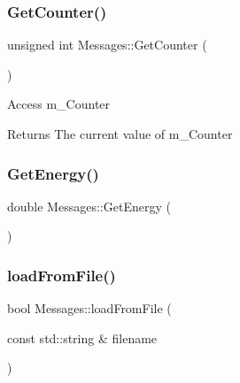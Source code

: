 \mbox{\label{classMessages_a256f8190d9ef6e25db6a5030f9805b5d}} 
\subsubsection{\texorpdfstring{Get\+Counter()}{GetCounter()}}
{\footnotesize\ttfamily unsigned int Messages\+::\+Get\+Counter (\begin{DoxyParamCaption}{ }\end{DoxyParamCaption})\hspace{0.3cm}{\ttfamily [inline]}}

Access m\+\_\+\+Counter \begin{DoxyReturn}{Returns}
The current value of m\+\_\+\+Counter 
\end{DoxyReturn}
\mbox{\label{classMessages_ab33cb49f408b16cf1fa29b5f141921c4}} 
\subsubsection{\texorpdfstring{Get\+Energy()}{GetEnergy()}}
{\footnotesize\ttfamily double Messages\+::\+Get\+Energy (\begin{DoxyParamCaption}{ }\end{DoxyParamCaption})\hspace{0.3cm}{\ttfamily [inline]}}

\mbox{\label{classMessages_a4263549c3f5c27b68279adbd7bcbcc30}} 
\subsubsection{\texorpdfstring{load\+From\+File()}{loadFromFile()}}
{\footnotesize\ttfamily bool Messages\+::load\+From\+File (\begin{DoxyParamCaption}\item[{const std\+::string \&}]{filename }\end{DoxyParamCaption})\hspace{0.3cm}{\ttfamily [inline]}}

\mbox{\label{classMessages_aecaad70bba58fd8d1a5640cb04088a2c}} 
